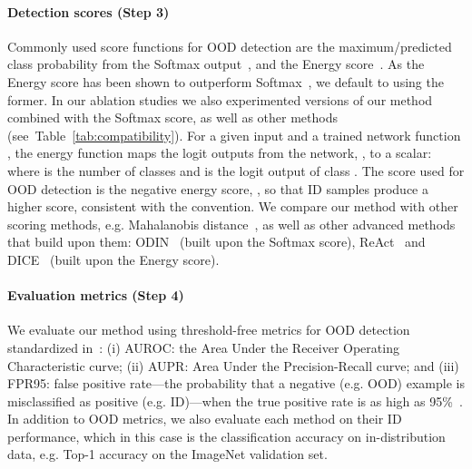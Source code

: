 \documentclass{article}
\newcommand{\tablabel}[1]{\label{tab:#1}}
\newcommand{\tabref}[1]{Table~\ref{tab:#1}}
\begin{document}
\begin{table}[hbt!]
\centering
{}
\caption{\textbf{Datasets and models in our OOD experiments.} We cover both moderate and large scale OOD benchmark settings, including evaluations on up to 10 OOD datasets and 3 architectures. }
\tablabel{benchmarks_table}
\end{table}


\paragraph{Detection scores (Step 3)}
Commonly used score functions for OOD detection are the maximum/predicted class probability from the Softmax output~\citep{hendrycks17baseline}, and the Energy score~\citep{liu2020energy}.
As the Energy score has been shown to outperform Softmax~\citep{liu2020energy, react}, we default to using the former. In our ablation studies we also experimented versions of our method combined with the Softmax score, as well as other methods (see~\tabref{compatibility}). For a given input  and a trained network function , the energy function  maps the logit outputs from the network, , to a scalar: 
where  is the number of classes and  is the logit output of class .
The score used for OOD detection is the negative energy score, , so that ID samples produce a higher score, consistent with the convention. We compare our method with other scoring methods, e.g. Mahalanobis distance~\citep{mahalanobis}, as well as other advanced methods that build upon them: ODIN~\citep{Liang2017} (built upon the Softmax score), ReAct~\citep{react} and DICE~\citep{sun2022dice} (built upon the Energy score).

\paragraph{Evaluation metrics (Step 4)}
We evaluate our method using threshold-free metrics for OOD detection standardized in~\citet{hendrycks17baseline}: (i) AUROC: the Area Under the Receiver Operating Characteristic curve; (ii) AUPR: Area Under the Precision-Recall curve; and (iii) FPR95: false positive rate---the probability that a negative (e.g. OOD) example is misclassified as positive (e.g. ID)---when the true positive rate is as high as 95\%~\citep{Liang2017}. 
In addition to OOD metrics, we also evaluate each method on their ID performance, which in this case is the classification accuracy on in-distribution data, e.g. Top-1 accuracy on the ImageNet validation set. 
\end{document}
